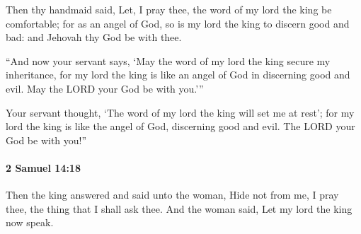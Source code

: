 			\begin{versebox}
					\item[BHS] 
					\item[ASV] Then thy handmaid said, Let, I pray thee, the word of my lord the king be comfortable; for as an angel of God, so is my lord the king to discern good and bad: and Jehovah thy God be with thee.
					\item[NIV] “And now your servant says, ‘May the word of my lord the king secure my inheritance, for my lord the king is like an angel of God in discerning good and evil. May the LORD your God be with you.’”
					\item[NRSV] Your servant thought, ‘The word of my lord the king will set me at rest’; for my lord the king is like the angel of God, discerning good and evil. The LORD your God be with you!”
			\end{versebox}

		\paragraph{2 Samuel 14:18} %
			\label{2SAMUEL-14-18}

			Then the king answered and said unto the woman, Hide not from me, I pray thee, the thing that I shall ask thee. And the woman said, Let my lord the king now speak.

